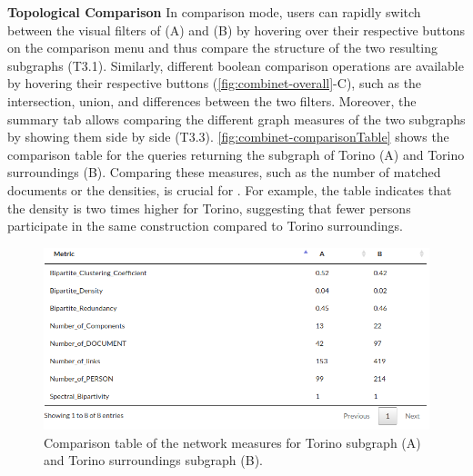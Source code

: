 \noindent\textbf{Topological Comparison}
In comparison mode,
users can rapidly switch between the visual filters of (A) and (B) by hovering over their respective buttons on the comparison menu and thus compare the structure of the two resulting subgraphs (T3.1).
Similarly, different boolean comparison operations are available by hovering their respective buttons (\autoref{fig:combinet-overall}-C), such as the intersection, union, and differences between the two filters. %
Moreover, the summary tab allows comparing the different graph measures of the two subgraphs by showing them side by side (T3.3).
\autoref{fig:combinet-comparisonTable} shows the comparison table for the queries returning the subgraph of Torino (A) and Torino surroundings (B).
Comparing these measures, such as the number of matched documents or the densities, is crucial for \sna.
For example, the table indicates that the density is two times higher for Torino, suggesting that fewer persons participate in the same construction compared to Torino surroundings.

\begin{figure}[!ht]
    \centering
    \includegraphics[width=0.8\linewidth]{static/figures/ComBiNet/graph_measures_Torino_territoireandpiemont}
  \caption{Comparison table of the network measures for Torino subgraph (A) and Torino surroundings subgraph (B).}\label{fig:combinet-comparisonTable}
\end{figure}


